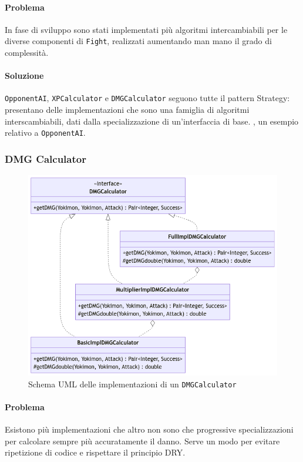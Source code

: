 \documentclass[a4paper,12pt]{report}
\begin{document}
\paragraph{Problema} In fase di sviluppo sono stati implementati più algoritmi intercambiabili per le diverse componenti di \texttt{Fight}, realizzati aumentando man mano il grado di complessità.
\paragraph{Soluzione} \texttt{OpponentAI}, \texttt{XPCalculator} e \texttt{DMGCalculator} seguono tutte il pattern Strategy: presentano delle implementazioni che sono una famiglia di algoritmi interscambiabili, dati dalla specializzazione di un’interfaccia di base.
%
, un esempio relativo a \texttt{OpponentAI}.
\subsubsection{DMG Calculator}
\begin{figure}[H]
\centering{}
\includegraphics[width=1.0\columnwidth]{images/uml-dmgcalc.png}
\caption{Schema UML delle implementazioni di un \texttt{DMGCalculator}}
\label{img:uml-dmgcalc}
\end{figure}
\paragraph{Problema} Esistono più implementazioni che altro non sono che progressive specializzazioni per calcolare sempre più accuratamente il danno.
%
Serve un modo per evitare ripetizione di codice e rispettare il principio DRY.
\end{document}
